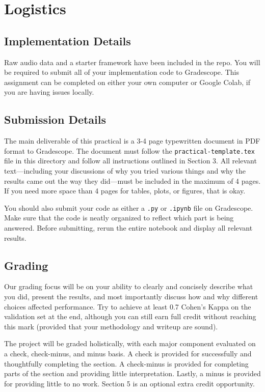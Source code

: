 \documentclass[11pt]{article}
\begin{document}
\section{Logistics}

\subsection{Implementation Details}

Raw audio data and a starter framework have been included in the repo. You will be required to submit all of your implementation code to Gradescope. This assignment can be completed on either your own computer or Google Colab, if you are having issues locally.

\subsection{Submission Details}

The main deliverable of this practical is a 3-4 page typewritten document in PDF format to Gradescope. The document must follow the \texttt{practical-template.tex} file in this directory and follow all instructions outlined in Section 3. All relevant text—including your discussions of why you tried various things and why the results came out the way they did—must be included in the maximum of 4 pages. If you need more space than 4 pages for tables, plots, or figures, that is okay.

You should also submit your code as either a \texttt{.py} or \texttt{.ipynb} file on Gradescope. Make sure that the code is neatly organized to reflect which part is being answered. Before submitting, rerun the entire notebook and display all relevant results.

\subsection{Grading}

Our grading focus will be on your ability to clearly and concisely describe what you did, present the results, and most importantly discuss how and why different choices affected performance. Try to achieve at least 0.7 Cohen's Kappa on the validation set at the end, although you can still earn full credit without reaching this mark (provided that your methodology and writeup are sound).

The project will be graded holistically, with each major component evaluated on a check, check-minus, and minus basis. A check is provided for successfully and thoughtfully completing the section. A check-minus is provided for completing parts of the section and providing little interpretation. Lastly, a minus is provided for providing little to no work. Section 5 is an optional extra credit opportunity.
\end{document}
